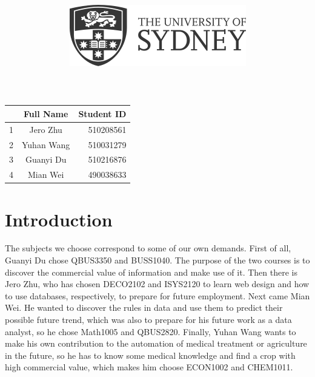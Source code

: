 \documentclass[12pt]{article}
\title{\includegraphics[scale=.5]{usydlogo.png}
\linebreak \\
\noindent \scalebox{1}{\textbf{\helveticafamily INFO1111: Computing 1A Professionalism}}
}
\date{\noindent \scalebox{1}{\textbf{\helveticafamily Semester 1 2021}}}
\author{\noindent \scalebox{1}{\textbf{\helveticafamily Project 2B}}}
\newcommand\helveticafamily{\fontfamily{phv} \selectfont}
\begin{document}
\maketitle
\begin{center}
    \textbf{\noindent \scalebox{1}{\textbf{\helveticafamily Group Number:3}}}
\end{center}


\begin{center}
\begin{tabular}{|l|c|r|}
\hline
  & Full Name & Student ID \\ \hline
1 & Jero Zhu  & 510208561  \\ \hline
2 & Yuhan Wang& 510031279  \\ \hline
3 & Guanyi Du & 510216876  \\ \hline
4 & Mian Wei  & 490038633  \\ \hline
\end{tabular}
\end{center}

\thispagestyle{empty}
\newpage

\tableofcontents %

\setcounter{page}{1}
\newpage
\section{Introduction}
The subjects we choose correspond to some of our own demands. First of all, Guanyi Du chose QBUS3350 and BUSS1040. The purpose of the two courses is to discover the commercial value of information and make use of it. Then there is Jero Zhu, who has chosen DECO2102 and ISYS2120 to learn web design and how to use databases, respectively, to prepare for future employment. Next came Mian Wei. He wanted to discover the rules in data and use them to predict their possible future trend, which was also to prepare for his future work as a data analyst, so he chose Math1005 and QBUS2820. Finally, Yuhan Wang wants to make his own contribution to the automation of medical treatment or agriculture in the future, so he has to know some medical knowledge and find a crop with high commercial value, which makes him choose ECON1002 and CHEM1011.

\newpage
\end{document}
